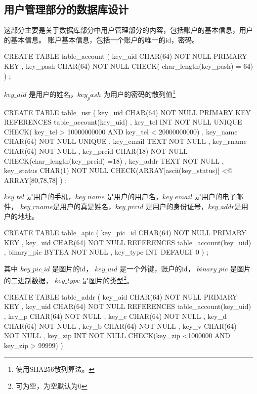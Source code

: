 \subsection{用户管理部分的数据库设计}
这部分主要是关于数据库部分中用户管理部分的内容，包括账户的基本信息，用户的基本信息。
账户基本信息，包括一个账户的唯一的id，密码。
\begin{sql}[caption=创建账户的表 table\_account]
    CREATE TABLE table_account
        ( key_uid CHAR(64) NOT NULL PRIMARY KEY
        , key_pash CHAR(64) NOT NULL CHECK( char_length(key_pash) = 64)
        )
    ;
\end{sql}
$key\_uid$ 是用户的姓名，$key_pash$ 为用户的密码的散列值\footnote{使用SHA256散列算法。}

\begin{sql}[caption=创建用户表 table\_usr]
    CREATE TABLE table_usr
        ( key_uid CHAR(64) NOT NULL PRIMARY KEY REFERENCES table_account(key_uid)
        , key_tel INT NOT NULL UNIQUE CHECK( key_tel > 10000000000 AND key_tel < 20000000000)
        , key_name CHAR(64) NOT NULL UNIQUE
        , key_email TEXT NOT NULL
        , key_rname CHAR(64) NOT NULL
        , key_prcid CHAR(18) NOT NULL CHECK(char_length(key_prcid) =18)
        , key_addr TEXT NOT NULL
        , key_status CHAR(1) NOT NULL CHECK(ARRAY[ascii(key_status)] <@ ARRAY[80,78,78]
        )
    ;
\end{sql}
$key\_tel$ 是用户的手机，$key\_name$ 是用户的用户名，$key\_email$ 是用户的电子邮件，
$key\_rname$是用户的真是姓名，$key\_prcid$ 是用户的身份证号，$key\_addr$是用户的地址。

\begin{sql}[caption=创建账户照片表 table\_apic]
    CREATE TABLE table_apic
        ( key_pic_id CHAR(64) NOT NULL PRIMARY KEY
        , key_uid CHAR(64) NOT NULL REFERENCES table_account(key_uid)
        , binary_pic BYTEA NOT NULL
        , key_type INT DEFAULT 0
        )
    ;
\end{sql}
其中 $key\_pic\_id$ 是图片的id，
$key\_uid$ 是一个外键，账户的id，
$binary\_pic$ 是图片的二进制数据，
$key\_type$ 是图片的类型\footnote{可为空，为空默认为0}。
\begin{sql}[caption=创建用户收货地址表 table\_addr]
	CREATE TABLE table_addr
		( key_aid CHAR(64) NOT NULL PRIMARY KEY
		, key_uid CHAR(64) NOT NULL REFERENCES table_account(key_uid)
		, key_p CHAR(64) NOT NULL 
		, key_c CHAR(64) NOT NULL
		, key_d CHAR(64) NOT NULL
		, key_b CHAR(64) NOT NULL
		, key_v CHAR(64) NOT NULL
		, key_zip INT NOT NULL CHECK(key_zip <1000000 AND key_zip > 99999)
		)
\end{sql}
